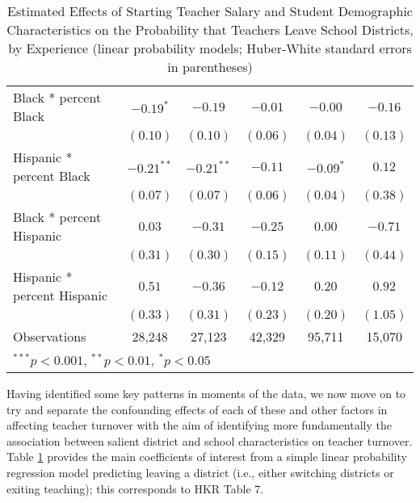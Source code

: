 \documentclass[12pt,]{article}
\begin{document}
\begin{table}
\begin{center}
\begin{tabular}{l c c c c c }
\quad Black * percent Black                 & $-0.19^{*}$  & $-0.19$      & $-0.01$       & $-0.00$      & $-0.16$      \\
                                            & $(0.10)$     & $(0.10)$     & $(0.06)$      & $(0.04)$     & $(0.13)$     \\
\quad Hispanic * percent Black              & $-0.21^{**}$ & $-0.21^{**}$ & $-0.11$       & $-0.09^{*}$  & $0.12$       \\
                                            & $(0.07)$     & $(0.07)$     & $(0.06)$      & $(0.04)$     & $(0.38)$     \\
\quad Black * percent Hispanic              & $0.03$       & $-0.31$      & $-0.25$       & $0.00$       & $-0.71$      \\
                                            & $(0.31)$     & $(0.30)$     & $(0.15)$      & $(0.11)$     & $(0.44)$     \\
\quad Hispanic * percent Hispanic           & $0.51$       & $-0.36$      & $-0.12$       & $0.20$       & $0.92$       \\
                                            & $(0.33)$     & $(0.31)$     & $(0.23)$      & $(0.20)$     & $(1.05)$     \\
\hline
Observations                                & 28,248        & 27,123        & 42,329         & 95,711        & 15,070        \\
\hline
\multicolumn{6}{l}{\scriptsize{$^{***}p<0.001$, $^{**}p<0.01$, $^*p<0.05$}}
\end{tabular}
\caption{Estimated Effects of Starting Teacher Salary and Student Demographic Characteristics on the Probability that Teachers Leave School Districts, by Experience (linear probability models; Huber-White standard  errors in parentheses)}
\label{tbl:reg_lpm}
\end{center}
\end{table}

Having identified some key patterns in moments of the data, we now move
on to try and separate the confounding effects of each of these and
other factors in affecting teacher turnover with the aim of identifying
more fundamentally the association between salient district and school
characteristics on teacher turnover. Table \ref{tbl:reg_lpm} provides
the main coefficients of interest from a simple linear probability
regression model predicting leaving a district (i.e., either switching
districts or exiting teaching); this corresponds to HKR Table 7.
\end{document}
